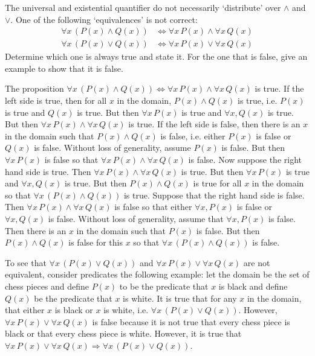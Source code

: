 \documentclass[11pt,letterpaper]{article}
\begin{document}
\newpage





 The universal and existential quantifier do not necessarily `distribute' over $\wedge$ and $\vee$. One of the following `equivalences' is not correct:
	\[
	\begin{aligned}
	\forall x\, (P(x) \wedge Q(x)) &\Longleftrightarrow \forall x\, P(x) \wedge \forall x\, Q(x) \\
	\forall x\, (P(x) \vee Q(x)) &\Longleftrightarrow \forall x\, P(x) \vee \forall x\, Q(x)
	\end{aligned}
	\]
Determine which one is always true and state it. For the one that is false, give an example to show that it is false. 

\sol The proposition $\forall x\, (P(x) \wedge Q(x)) \Longleftrightarrow \forall x\, P(x) \wedge \forall x\, Q(x)$ is true. If the left side is true, then for all $x$ in the domain, $P(x) \wedge Q(x)$ is true, i.e. $P(x)$ is true and $Q(x)$ is true. But then $\forall x\, P(x)$ is true and $\forall x, Q(x)$ is true. But then $\forall x\, P(x) \wedge \forall x\, Q(x)$ is true. If the left side is false, then there is an $x$ in the domain such that $P(x) \wedge Q(x)$ is false, i.e. either $P(x)$ is false or $Q(x)$ is false. Without loss of generality, assume $P(x)$ is false. But then $\forall x\, P(x)$ is false so that $\forall x\, P(x) \wedge \forall x\, Q(x)$ is false. Now suppose the right hand side is true. Then $\forall x\, P(x) \wedge \forall x\, Q(x)$ is true. But then $\forall x\, P(x)$ is true and $\forall x, Q(x)$ is true. But then $P(x) \wedge Q(x)$ is true for all $x$ in the domain so that $\forall x\, (P(x) \wedge Q(x))$ is true. Suppose that the right hand side is false. Then $\forall x\, P(x) \wedge \forall x\, Q(x)$ is false so that either $\forall x, P(x)$ is false or $\forall x, Q(x)$ is false. Without loss of generality, assume that $\forall x, P(x)$ is false. Then there is an $x$ in the domain such that $P(x)$ is false. But then $P(x) \wedge Q(x)$ is false for this $x$ so that $\forall x\, (P(x) \wedge Q(x))$ is false. 

To see that $\forall x\, (P(x) \vee Q(x))$ and $\forall x\, P(x) \vee \forall x\, Q(x)$ are not equivalent, consider predicates the following example: let the domain be the set of chess pieces and define $P(x)$ to be the predicate that $x$ is black and define $Q(x)$ be the predicate that $x$ is white. It is true that for any $x$ in the domain, that either $x$ is black or $x$ is white, i.e. $\forall x\, (P(x) \vee Q(x))$. However, $\forall x\, P(x) \vee \forall x\, Q(x)$ is false because it is not true that every chess piece is black or that every chess piece is white. However, it is true that $\forall x\, P(x) \vee \forall x\, Q(x) \Rightarrow \forall x\, (P(x) \vee Q(x))$. 
\end{document}
